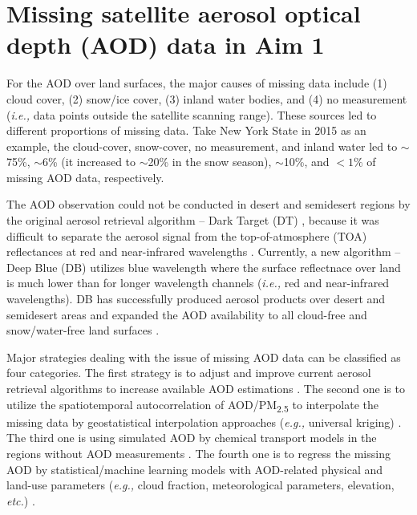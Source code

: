 \documentclass[11pt]{article}
\newcommand{\tsub}{\textsubscript}
\begin{document}
\section{Missing satellite aerosol optical depth (AOD) data in Aim 1}
\begin{enumerate*}[{[a)]}]
    \item For the AOD over land surfaces, the major causes of missing data include (1) cloud cover, (2) snow/ice cover, (3) inland water bodies, and (4) no measurement (\textit{i.e.,} data points outside the satellite scanning range). These sources led to different proportions of missing data. Take New York State in 2015 as an example, the cloud-cover, snow-cover, no measurement, and inland water led to $\sim$75\%, $\sim$6\% (it increased to $\sim$20\% in the snow season), $\sim$10\%, and $< 1\%$ of missing AOD data, respectively. 
    
    The AOD observation could not be conducted in desert and semidesert regions by the original aerosol retrieval algorithm -- Dark Target (DT) \citep{kaufman1997modis, levy2007second}, because it was difficult to separate the aerosol signal from the top-of-atmosphere (TOA) reflectances at red and near-infrared wavelengths \citep{hsu2013enhanced}. Currently, a new algorithm -- Deep Blue (DB) \citep{hsu2004aerosol} utilizes blue wavelength where the surface reflectnace over land is much lower than for longer wavelength channels (\textit{i.e.,} red and near-infrared wavelengths). DB has successfully produced aerosol products over desert and semidesert areas and expanded the AOD availability to all cloud-free and snow/water-free land surfaces \citep{hsu2013enhanced}. 
    
    Major strategies dealing with the issue of missing AOD data can be classified as four categories. The first strategy is to adjust and improve current aerosol retrieval algorithms to increase available AOD estimations \citep{van2011satellite}. The second one is to utilize the spatiotemporal autocorrelation of AOD/PM\tsub{2.5} to interpolate the missing data by geostatistical interpolation approaches (\textit{e.g.,} universal kriging) \citep{kloog2011assessing, kloog2012incorporating}. The third one is using simulated AOD by chemical transport models in the regions without AOD measurements \citep{hu2017estimating}. The fourth one is to regress the missing AOD by statistical/machine learning models with AOD-related physical and land-use parameters (\textit{e.g.,} cloud fraction, meteorological parameters, elevation, \textit{etc.}) \citep{xiao2017full}.
    

\end{enumerate*}
\end{document}
